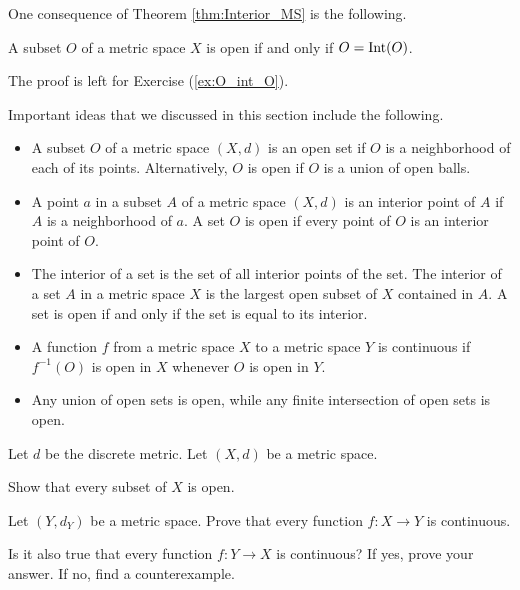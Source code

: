 One consequence of Theorem \ref{thm:Interior_MS} is the following.

\begin{corollary} A subset $O$ of a metric space $X$ is open if and only if $O = \text{Int}(O)$. 
\end{corollary}
 
The proof is left for Exercise (\ref{ex:O_int_O}).

Important ideas that we discussed in this section include the following.
\begin{itemize}
\item A subset $O$ of a metric space $(X,d)$ is an open set if $O$ is a neighborhood of each of its points. Alternatively, $O$ is open if $O$ is a union of open balls.
\item A point $a$ in a subset $A$ of a metric space $(X,d)$ is an interior point of $A$ if $A$ is a neighborhood of $a$. A set $O$ is open if every point of $O$ is an interior point of $O$. 
\item The interior of a set is the set of all interior points of the set. The interior of a set $A$ in a metric space $X$ is the largest open subset of $X$ contained in $A$. A set is open if and only if the set is equal to its interior. 
\item A function $f$ from a metric space $X$ to a metric space $Y$ is continuous if $f^{-1}(O)$ is open in $X$ whenever $O$ is open in $Y$. 
\item Any union of open sets is open, while any finite intersection of open sets is open.
\end{itemize}


\be

\item Let $d$ be the discrete metric. Let $(X,d)$ be a metric space. 
	\ba
	
	\item Show that every subset of $X$ is open.
		
	\item Let $(Y, d_Y)$ be a metric space. Prove that every function $f: X \to Y$ is continuous. 
	
	\item Is it also true that every function $f: Y \to X$ is continuous? If yes, prove your answer. If no, find a counterexample. 

	\ea
	
